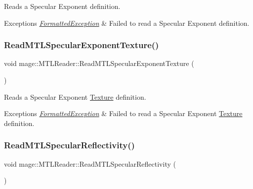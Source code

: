 Reads a Specular Exponent definition.


\begin{DoxyExceptions}{Exceptions}
{\em \hyperlink{structmage_1_1_formatted_exception}{Formatted\+Exception}} & Failed to read a Specular Exponent definition. \\
\hline
\end{DoxyExceptions}
\hypertarget{classmage_1_1_m_t_l_reader_a9b68187f940dc05a5d86527843f09d18}{}\label{classmage_1_1_m_t_l_reader_a9b68187f940dc05a5d86527843f09d18} 
\subsubsection{\texorpdfstring{Read\+M\+T\+L\+Specular\+Exponent\+Texture()}{ReadMTLSpecularExponentTexture()}}
{\footnotesize\ttfamily void mage\+::\+M\+T\+L\+Reader\+::\+Read\+M\+T\+L\+Specular\+Exponent\+Texture (\begin{DoxyParamCaption}{ }\end{DoxyParamCaption})\hspace{0.3cm}{\ttfamily [private]}}

Reads a Specular Exponent \hyperlink{classmage_1_1_texture}{Texture} definition.


\begin{DoxyExceptions}{Exceptions}
{\em \hyperlink{structmage_1_1_formatted_exception}{Formatted\+Exception}} & Failed to read a Specular Exponent \hyperlink{classmage_1_1_texture}{Texture} definition. \\
\hline
\end{DoxyExceptions}
\hypertarget{classmage_1_1_m_t_l_reader_aa90f43e397bc5fc277b936bdeff4e672}{}\label{classmage_1_1_m_t_l_reader_aa90f43e397bc5fc277b936bdeff4e672} 
\subsubsection{\texorpdfstring{Read\+M\+T\+L\+Specular\+Reflectivity()}{ReadMTLSpecularReflectivity()}}
{\footnotesize\ttfamily void mage\+::\+M\+T\+L\+Reader\+::\+Read\+M\+T\+L\+Specular\+Reflectivity (\begin{DoxyParamCaption}{ }\end{DoxyParamCaption})\hspace{0.3cm}{\ttfamily [private]}}

